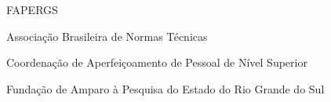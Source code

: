 %
\begin{listadesiglas}{FAPERGS}
\item[ABNT] Associação Brasileira de Normas Técnicas
\item[CAPES] Coordenação de Aperfeiçoamento de Pessoal de Nível Superior
\item[FAPERGS] Fundação de Amparo à Pesquisa do Estado do Rio Grande do Sul
\end{listadesiglas}
